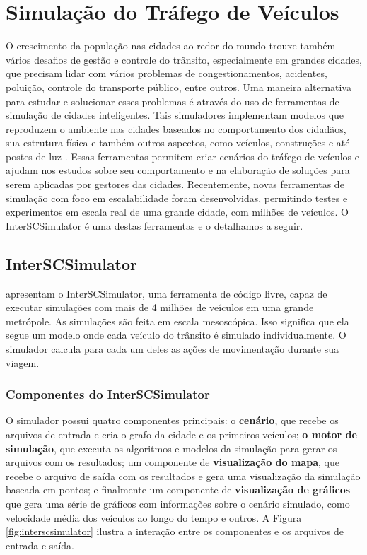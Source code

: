 {\section{Simulação do Tráfego de Veículos}

  O crescimento da população nas cidades ao redor do mundo trouxe também vários
desafios de gestão e controle do trânsito, especialmente em grandes cidades,
que precisam lidar com vários problemas de congestionamentos, acidentes,
poluição, controle do transporte público, entre outros. Uma maneira alternativa
para estudar e solucionar esses problemas é através do uso de ferramentas de
simulação de cidades inteligentes. Tais simuladores implementam modelos que
reproduzem o ambiente nas cidades baseados no comportamento dos cidadãos, sua
estrutura física e também outros aspectos, como veículos, construções e até
postes de luz \citep{Arthur2019}. Essas ferramentas permitem criar cenários do
tráfego de veículos e ajudam nos estudos sobre seu comportamento e na
elaboração de soluções para serem aplicadas por gestores das cidades.
Recentemente, novas ferramentas de simulação com foco em escalabilidade foram
desenvolvidas, permitindo testes e experimentos em escala real de uma grande
cidade, com milhões de veículos. O InterSCSimulator é uma destas ferramentas e
o detalhamos a seguir.

\subsection{InterSCSimulator}
\label{sec:interscsimulator}

\citet{mabs2017} apresentam o InterSCSimulator, uma ferramenta de código livre,
capaz de executar simulações com mais de 4 milhões de veículos em uma grande
metrópole.  As simulações são feita em escala mesoscópica. Isso significa que
ela segue um modelo onde cada veículo do trânsito é simulado individualmente. O
simulador calcula para cada um deles as ações de movimentação durante sua
viagem.

\subsubsection{Componentes do InterSCSimulator}

  O simulador possui quatro componentes principais: o \textbf{cenário}, que
recebe os arquivos de entrada e cria o grafo da cidade e os primeiros veículos;
\textbf{o motor de simulação}, que executa os algoritmos e modelos da simulação
para gerar os arquivos com os resultados; um componente de
\textbf{visualização do mapa}, que recebe o arquivo de saída com os resultados
e gera uma visualização da simulação baseada em pontos; e finalmente um
componente de \textbf{visualização de gráficos} que gera uma série de gráficos
com informações sobre o cenário simulado, como velocidade média dos veículos ao
longo do tempo e outros. A Figura \ref{fig:interscsimulator} ilustra a
interação entre os componentes e os arquivos de entrada e saída.

}
